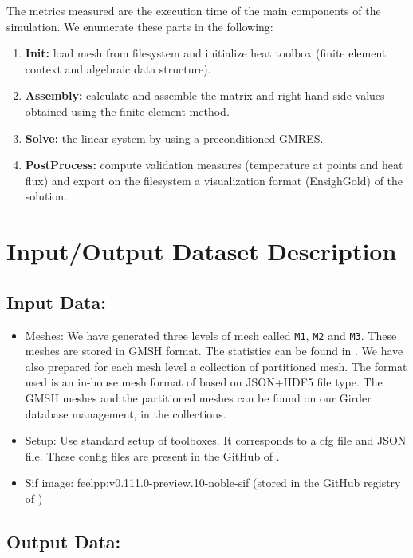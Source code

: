 \documentclass[11pt]{article}
\begin{document}
The metrics measured are the execution time of the main components of the simulation.
We enumerate these parts in the following:
\begin{enumerate}
\item \textbf{Init:} load mesh from filesystem and initialize heat toolbox (finite element context and algebraic data structure).
\item \textbf{Assembly:} calculate and assemble the matrix and right-hand side values obtained using the finite element method.
\item \textbf{Solve:} the linear system by using a preconditioned GMRES.
\item \textbf{PostProcess:} compute validation measures (temperature at points and heat flux) and export on the filesystem a visualization format (EnsighGold) of the solution.
\end{enumerate}




\section{Input/Output Dataset Description}


\subsection{Input Data:}
  \begin{itemize}
  \item Meshes: We have generated three levels of mesh called \texttt{M1}, \texttt{M2}
    and \texttt{M3}. These meshes are stored in GMSH format. The statistics can be found in . We have also prepared for
    each mesh level a collection of partitioned mesh.
    The format used is an in-house mesh format of \Feelpp based on
    JSON+HDF5 file type.
    The GMSH meshes and the partitioned meshes can be found on our Girder
    database management, in the \Feelpp collections.
  \item Setup: Use standard setup of \Feelpp toolboxes. It corresponds to a cfg
    file and JSON file. These config files are present in the GitHub of \Feelpp.
  \item Sif image: feelpp:v0.111.0-preview.10-noble-sif  (stored in the GitHub registry of \Feelpp)
  \end{itemize}

\subsection{Output Data:}
\end{document}
